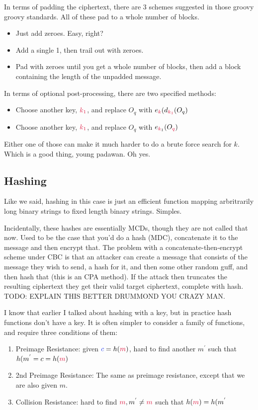     In terms of padding the ciphertext, there are 3 schemes suggested in those groovy groovy standards. All of these pad to a whole number of blocks.
    \begin{itemize}
        \item Just add zeroes. Easy, right?
        \item Add a single 1, then trail out with zeroes.
        \item Pad with zeroes until you get a whole number of blocks, then add a block containing the length of the unpadded message.
    \end{itemize}

    In terms of optional post-processing, there are two specified methods:
    \begin{itemize}
        \item Choose another key, $\csubk{1}$, and replace $O_{q}$ with $e_{\ck}(d_{\csubk{1}}(O_{q})$
        \item Choose another key, $\csubk{1}$, and replace $O_{q}$ with $e_{\ck_{1}}(O_{\cq})$ 
    \end{itemize}

    Either one of those can make it much harder to do a brute force search for $k$. Which is a good thing, young padawan. Oh yes.

    \subsection{Hashing}
    Like we said, hashing in this case is just an efficient function mapping arbritrarily long binary strings to fixed length binary strings. Simples.

    Incidentally, these hashes are essentially MCDs, though they are not called that now. Used to be the case that you'd do a hash (MDC), concatenate it to the message and then encrypt that. The problem with a concatenate-then-encrypt scheme under CBC is that an attacker can create a message that consists of the message they wish to send, a hash for it, and then some other random guff, and then hash that (this is an CPA method). If the attack then truncates the resulting ciphertext they get their valid target ciphertext, complete with hash. TODO: EXPLAIN THIS BETTER DRUMMOND YOU CRAZY MAN.

    I know that earlier I talked about hashing with a key, but in practice hash functions don't have a key. It is often simpler to consider a family of functions, and require three conditions of them:
    \begin{enumerate}
        \item Preimage Resistance: given $\cc = h(\cm)$, hard to find another $m^{'}$ such that $h(m^{'} = c = h(\cm)$
        \item 2nd Preimage Resistance: The same as preimage resistance, except that we are also given $m$.
        \item Collision Resistance: hard to find $\cm, m^{'} \neq \cm$ such that $h(\cm) = h(m^{'}$
    \end{enumerate}

